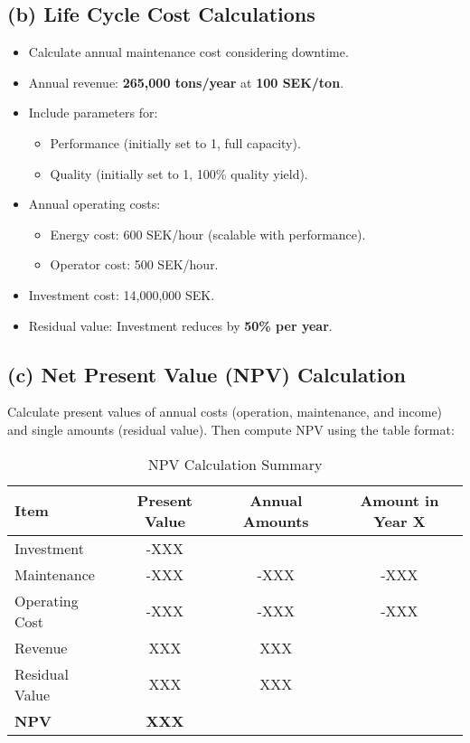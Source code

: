 \documentclass[a4paper,12pt]{article}
\begin{document}
\subsection{(b) Life Cycle Cost Calculations}
\begin{itemize}
    \item Calculate annual maintenance cost considering downtime.
    \item Annual revenue: \textbf{265,000 tons/year} at \textbf{100 SEK/ton}.
    \item Include parameters for:
    \begin{itemize}
        \item Performance (initially set to 1, full capacity).
        \item Quality (initially set to 1, 100\% quality yield).
    \end{itemize}
    \item Annual operating costs:
    \begin{itemize}
        \item Energy cost: 600 SEK/hour (scalable with performance).
        \item Operator cost: 500 SEK/hour.
    \end{itemize}
    \item Investment cost: 14,000,000 SEK.
    \item Residual value: Investment reduces by \textbf{50\% per year}.
\end{itemize}

\subsection{(c) Net Present Value (NPV) Calculation}
Calculate present values of annual costs (operation, maintenance, and income) and single amounts (residual value). Then compute NPV using the table format:

\begin{table}[h]
    \centering
    \begin{tabular}{lccc}
        \toprule
        \textbf{Item} & \textbf{Present Value} & \textbf{Annual Amounts} & \textbf{Amount in Year X} \\
        \midrule
        Investment & -XXX &  &  \\
        Maintenance & -XXX & -XXX & -XXX \\
        Operating Cost & -XXX & -XXX & -XXX \\
        Revenue & XXX & XXX &  \\
        Residual Value & XXX & XXX &  \\
        \textbf{NPV} & \textbf{XXX} &  &  \\
        \bottomrule
    \end{tabular}
    \caption{NPV Calculation Summary}
\end{table}
\end{document}

